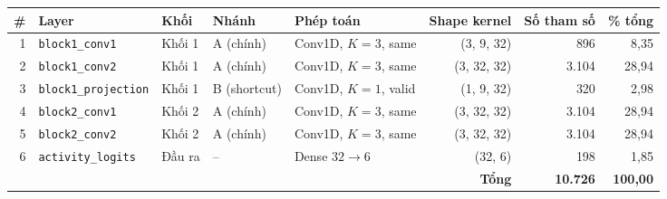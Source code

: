 \begin{tabular}{rllllrrr}
\toprule
\# & Layer & Khối & Nhánh & Phép toán & Shape kernel & Số tham số & \% tổng \\
\midrule
1 & \texttt{block1\_conv1} & Khối 1 & A (chính) & Conv1D, $K{=}3$, same & (3, 9, 32) & 896 & 8,35 \\
2 & \texttt{block1\_conv2} & Khối 1 & A (chính) & Conv1D, $K{=}3$, same & (3, 32, 32) & 3.104 & 28,94 \\
3 & \texttt{block1\_projection} & Khối 1 & B (shortcut) & Conv1D, $K{=}1$, valid & (1, 9, 32) & 320 & 2,98 \\
4 & \texttt{block2\_conv1} & Khối 2 & A (chính) & Conv1D, $K{=}3$, same & (3, 32, 32) & 3.104 & 28,94 \\
5 & \texttt{block2\_conv2} & Khối 2 & A (chính) & Conv1D, $K{=}3$, same & (3, 32, 32) & 3.104 & 28,94 \\
6 & \texttt{activity\_logits} & Đầu ra & -- & Dense $32\to6$ & (32, 6) & 198 & 1,85 \\
\midrule
& & & & & \textbf{Tổng} & \textbf{10.726} & \textbf{100,00} \\
\bottomrule
\end{tabular}
